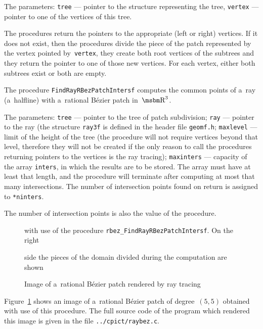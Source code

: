 The parameters: \texttt{tree} --- pointer to the structure representing the
tree, \texttt{vertex} --- pointer to one of the vertices of this tree.

The procedures return the pointers to the appropriate (left or right) vertices.
If it does not exist, then the procedures divide the piece of the patch
represented by the vertex pointed by~\texttt{vertex}, they create
both root vertices of the subtrees and they return the pointer to one of
those new vertices. For each vertex, either both subtrees exist
or both are empty.

\vspace{\bigskipamount}
The procedure \texttt{FindRayRBezPatchIntersf} computes the common points
of a~ray (a~halfline) with a~rational B\'{e}zier patch in~$\R^3$.

The parameters: \texttt{tree} --- pointer to the tree of patch subdivision;
\texttt{ray} --- pointer to the ray (the structure \texttt{ray3f} is defined
in the header file \texttt{geomf.h}; \texttt{maxlevel} --- limit of the height
of the tree (the procedure will not require vertices beyond that level,
therefore they will not be created if the only reason to call the
procedures returning pointers to the vertices is the ray tracing);
\texttt{maxinters} --- capacity of the array \texttt{inters}, in which the
results are to be stored. The array must have at least that length,
and the procedure will terminate after computing at most that many
intersections. The number of intersection points found on return
is assigned to \texttt{*ninters}.

The number of intersection points is also the value of the procedure.

\begin{figure}[ht]
  \centerline{}
  \caption{\label{fig:raybezp}Image of a~rational B\'{e}zier patch rendered by ray tracing}
  \centerline{with use of the procedure \texttt{rbez\_FindRayRBezPatchIntersf}. On the right}
  \centerline{side the pieces of the domain divided during the computation are shown}
\end{figure}
Figure~\ref{fig:raybezp} shows an image of a~rational B\'{e}zier patch
of degree~$(5,5)$ obtained with use of this procedure.
The full source code of the program which rendered this image is
given in the file \texttt{../cpict/raybez.c}.


